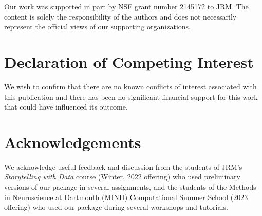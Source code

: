 \documentclass[preprint,12pt,a4paper]{elsarticle}
\begin{document}
Our work was supported in part by NSF grant number 2145172 to JRM.
The content is solely the responsibility of the authors and does not
necessarily represent the official views of our supporting
organizations.


\section*{Declaration of Competing Interest}

We wish to confirm that there are no known conflicts of interest
associated with this publication and there has been no significant
financial support for this work that could have influenced its
outcome.


\section*{Acknowledgements}

We acknowledge useful feedback and discussion from the students of
JRM's \textit{Storytelling with Data} course (Winter, 2022 offering)
who used preliminary versions of our package in several assignments,
and the students of the Methods in Neuroscience at Dartmouth (MIND)
Computational Summer School (2023 offering) who used our package
during several workshops and tutorials.




\end{document}
